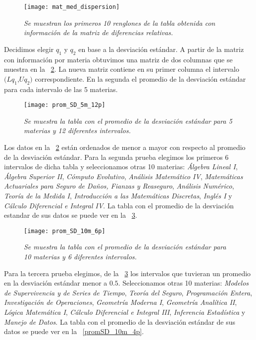 \begin{figure}[H]
\centering
\texttt{[image: mat\_med\_dispersion]} %
\caption[\textit{Matriz con información por materia}]{\textit{Se muestran los primeros 10 renglones de la tabla obtenida con información de la matriz de diferencias relativas.}}\label{matMedDispersion}
\end{figure}


Decidimos elegir $q_{1}$ y $q_{2}$ en base a la desviación estándar. A partir de la matriz con información por materia obtuvimos una matriz de dos columnas que se muestra en la \figurename{~\ref{promSD_5m_12p}}. La nueva matriz contiene en su primer columna el intervalo $(Lq_{1}$,$Uq_{2})$ correspondiente. En la segunda el promedio de la desviación estándar para cada intervalo de las 5 materias.

\begin{figure}[H]
\centering
\texttt{[image: prom\_SD\_5m\_12p]} %
\caption[\textit{Promedio de la desviación estándar: 5 materias, 12 intervalos}]{\textit{Se muestra la tabla con el promedio de la desviación estándar para 5 materias y 12 diferentes intervalos.}}\label{promSD_5m_12p}
\end{figure}


Los datos en la \figurename{~\ref{promSD_5m_12p}} están ordenados de menor a mayor con respecto al promedio de la desviación estándar. Para la segunda prueba elegimos los primeros 6 intervalos de dicha tabla y seleccionamos otras 10 materias: \textit{Álgebra Lineal I}, \textit{Álgebra Superior II}, \textit{Cómputo Evolutivo}, \textit{Análisis Matemático IV}, \textit{Matemáticas Actuariales para Seguro de Daños, Fianzas y Reaseguro}, \textit{Análisis Numérico}, \textit{Teoría de la Medida I}, \textit{Introducción a las Matemáticas Discretas}, \textit{Inglés I} y \textit{Cálculo Diferencial e Integral IV}. La tabla con el promedio de la desviación estandar de sus datos se puede ver en la \figurename{~\ref{promSD_10m_6p}}.


\begin{figure}[H]
\centering
\texttt{[image: prom\_SD\_10m\_6p]} %
\caption[\textit{Promedio de la desviación estándar: 10 materias, 6 intervalos}]{\textit{Se muestra la tabla con el promedio de la desviación estándar para 10 materias y 6 diferentes intervalos.}}\label{promSD_10m_6p}
\end{figure}


Para la tercera prueba elegimos, de la \figurename{~\ref{promSD_10m_6p}} los intervalos que tuvieran un promedio en la desviación estándar menor a $0.5$. Seleccionamos otras 10 materias: \textit{Modelos de Supervivencia y de Series de Tiempo}, \textit{Teoría del Seguro}, \textit{Programación Entera}, \textit{Investigación de Operaciones}, \textit{Geometría Moderna I}, \textit{Geometría Analítica II}, \textit{Lógica Matemática I}, \textit{Cálculo Diferencial e Integral III}, \textit{Inferencia Estadística} y \textit{Manejo de Datos}. La tabla con el promedio de la desviación estándar de sus datos se puede ver en la \figurename{~\ref{promSD_10m_4p}}.


